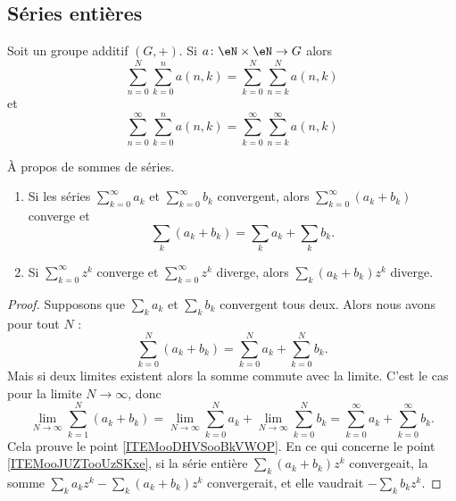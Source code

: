 \subsection{Séries entières}

\begin{lemma}	\label{LEMooKMCIooItDMRo}
	Soit un groupe additif \( (G,+)\). Si \(a \colon \eN\times \eN\to G  \) alors
	\begin{equation}
		\sum_{n=0}^N\sum_{k=0}^na(n,k)=\sum_{k=0}^N\sum_{n=k}^Na(n,k)
	\end{equation}
	et
	\begin{equation}
		\sum_{n=0}^{\infty}\sum_{k=0}^na(n,k)=\sum_{k=0}^{\infty}\sum_{n=k}^{\infty}a(n,k)
	\end{equation}
\end{lemma}


\begin{proposition}     \label{PROPooUEBWooUQBQvP}
	À propos de sommes de séries.
	\begin{enumerate}
		\item		\label{ITEMooDHVSooBkVWOP}
		      Si les séries \( \sum_{k=0}^{\infty}a_k\) et \( \sum_{k=0}^{\infty}b_k\) convergent, alors \( \sum_{k=0}^{\infty}(a_k+b_k)\) converge et
		      \begin{equation}
			      \sum_k (a_k+b_k) = \sum_k a_k + \sum_k b_k.
		      \end{equation}
		\item	\label{ITEMooJUZTooUzSKxe}
		      Si \( \sum_{k=0}^{\infty}z^k\) converge et \( \sum_{k=0}^{\infty}z^k\) diverge, alors \( \sum_{k}(a_k+b_k)z^k\) diverge.
	\end{enumerate}
\end{proposition}

\begin{proof}
	Supposons que \( \sum_ka_k\) et \( \sum_kb_k\) convergent tous deux. Alors nous avons pour tout \( N\) :
	\begin{equation}
		\sum_{k=0}^N(a_k+b_k)=\sum_{k=0}^Na_k+\sum_{k=0}^Nb_k.
	\end{equation}
	Mais si deux limites existent alors la somme commute avec la limite. C'est le cas pour la limite \( N\to \infty\), donc
	\begin{equation}
		\lim_{N\to \infty} \sum_{k=1}^{N}(a_k+b_k)=\lim_{N\to \infty} \sum_{k=0}^{N}a_k+\lim_{N\to \infty} \sum_{k=0}^{N}b_k=\sum_{k=0}^{\infty}a_k+\sum_{k=0}^{\infty}b_k.
	\end{equation}
	Cela prouve le point \ref{ITEMooDHVSooBkVWOP}. En ce qui concerne le point \ref{ITEMooJUZTooUzSKxe}, si la série entière \( \sum_k(a_k+b_k)z^k\) convergeait, la somme \( \sum_ka_kz^k-\sum_k(a_k+b_k)z^k\) convergerait, et elle vaudrait \( -\sum_kb_kz^k\).
\end{proof}

